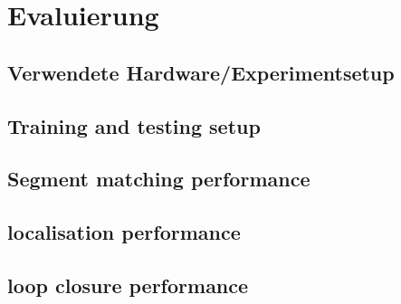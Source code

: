 \chapter{Evaluierung}

\section{Verwendete Hardware/Experimentsetup}

\section{Training and testing setup}

\section{Segment matching performance}

\section{localisation performance}

\section{loop closure performance}


